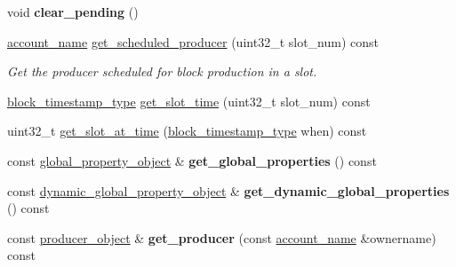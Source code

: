 \begin{DoxyCompactItemize}
void {\bfseries clear\+\_\+pending} ()
\item 
\mbox{\hyperlink{structaacio_1_1chain_1_1name}{account\+\_\+name}} \mbox{\hyperlink{classaacio_1_1chain_1_1chain__controller_a70ddb9268b9ce5cac20104ab400fb462}{get\+\_\+scheduled\+\_\+producer}} (uint32\+\_\+t slot\+\_\+num) const
\begin{DoxyCompactList}\small\item\em Get the producer scheduled for block production in a slot. \end{DoxyCompactList}\item 
\mbox{\hyperlink{classaacio_1_1chain_1_1block__timestamp}{block\+\_\+timestamp\+\_\+type}} \mbox{\hyperlink{classaacio_1_1chain_1_1chain__controller_a16c358c4d8477b5c7f4cedbde3faa235}{get\+\_\+slot\+\_\+time}} (uint32\+\_\+t slot\+\_\+num) const
\item 
uint32\+\_\+t \mbox{\hyperlink{classaacio_1_1chain_1_1chain__controller_a9e231a27f0c30eedeff295bbf53b318a}{get\+\_\+slot\+\_\+at\+\_\+time}} (\mbox{\hyperlink{classaacio_1_1chain_1_1block__timestamp}{block\+\_\+timestamp\+\_\+type}} when) const
\item 
\mbox{\label{classaacio_1_1chain_1_1chain__controller_a1a19f17f4bf936331db62943f494f15d}} 
const \mbox{\hyperlink{classaacio_1_1chain_1_1global__property__object}{global\+\_\+property\+\_\+object}} \& {\bfseries get\+\_\+global\+\_\+properties} () const
\item 
\mbox{\label{classaacio_1_1chain_1_1chain__controller_a7d01e359ac48651ab706a579ffaf064f}} 
const \mbox{\hyperlink{classaacio_1_1chain_1_1dynamic__global__property__object}{dynamic\+\_\+global\+\_\+property\+\_\+object}} \& {\bfseries get\+\_\+dynamic\+\_\+global\+\_\+properties} () const
\item 
\mbox{\label{classaacio_1_1chain_1_1chain__controller_a8e6d08f6cd4b231a72e5f6c9833379db}} 
const \mbox{\hyperlink{classaacio_1_1chain_1_1producer__object}{producer\+\_\+object}} \& {\bfseries get\+\_\+producer} (const \mbox{\hyperlink{structaacio_1_1chain_1_1name}{account\+\_\+name}} \&ownername) const
\item 
\mbox{\label{classaacio_1_1chain_1_1chain__controller_aee5ce034c2b34dde11979fe27e19e187}} 

\end{DoxyCompactItemize}
